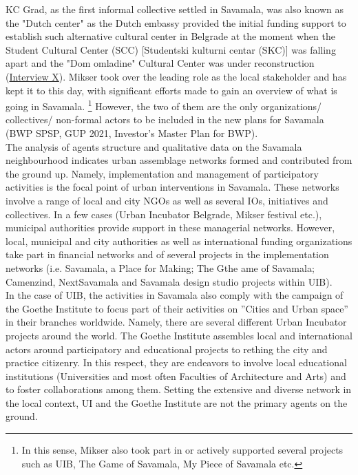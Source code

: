 \documentclass[11pt]{report}
\begin{document}
{{{{KC Grad, as the first informal collective settled in Savamala, was also known as the "Dutch center" as the Dutch embassy provided the initial funding support to establish such alternative cultural center in Belgrade at the moment when the Student Cultural Center (SCC) [Studentski kulturni centar (SKC)] was falling apart and the "Dom omladine" Cultural Center was under reconstruction (\href{InterviewX}{Interview X}).
Mikser took over the leading role as the local stakeholder and has kept it to this day, with significant efforts made to gain an overview of
what is going in Savamala.
\footnote{In this sense, Mikser also took part in or actively supported several projects such as UIB, The Game of Savamala, My Piece of Savamala etc.}
However, the two of them are the only organizations/ collectives/ non-formal actors to be included in the new plans for Savamala (BWP SPSP, GUP 2021, Investor's Master Plan for BWP).
\\

The analysis of agents structure and qualitative data on the Savamala neighbourhood indicates urban assemblage networks formed and contributed from the ground up. Namely, implementation and management of participatory activities is the focal point of urban interventions in Savamala. These networks involve a range of local and city NGOs as well as several IOs, initiatives and collectives. In a few cases (Urban Incubator Belgrade, Mikser festival etc.), municipal authorities provide support in these managerial networks. However, local, municipal and city authorities as well as international funding organizations take part in financial networks and of several projects in the implementation networks (i.e. Savamala, a Place for Making; The Gthe ame of Savamala; Camenzind, NextSavamala and Savamala design studio projects within UIB).
\\

In the case of UIB, the activities in Savamala also comply with the campaign of the Goethe Institute to focus part of their activities on ”Cities and Urban space” in their branches worldwide. Namely, there are several different Urban Incubator projects around the world. The Goethe Institute assembles local and international actors around participatory and educational projects to rething the city and practice citizenry. In this respect, they are endeavors to involve local educational institutions (Universities and most often Faculties of Architecture and Arts) and to foster collaborations among them. Setting the extensive and diverse network in the local context, UI and the Goethe Institute are not the primary agents on the ground.
\\

}}}}
\end{document}
